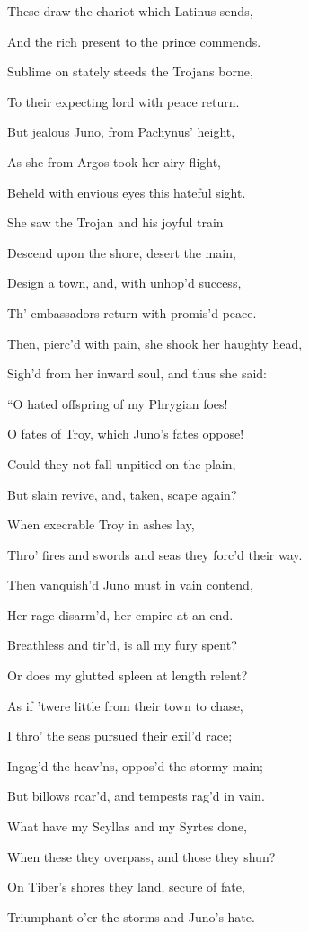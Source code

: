 These draw the chariot which Latinus sends,

And the rich present to the prince commends.

Sublime on stately steeds the Trojans borne,

To their expecting lord with peace return.

But jealous Juno, from Pachynus’ height,

As she from Argos took her airy flight,

Beheld with envious eyes this hateful sight.

She saw the Trojan and his joyful train

Descend upon the shore, desert the main,

Design a town, and, with unhop’d success,

Th’ embassadors return with promis’d peace.

Then, pierc’d with pain, she shook her haughty head,

Sigh’d from her inward soul, and thus she said:

“O hated offspring of my Phrygian foes!

O fates of Troy, which Juno’s fates oppose!

Could they not fall unpitied on the plain,

But slain revive, and, taken, scape again?

When execrable Troy in ashes lay,

Thro’ fires and swords and seas they forc’d their way.

Then vanquish’d Juno must in vain contend,

Her rage disarm’d, her empire at an end.

Breathless and tir’d, is all my fury spent?

Or does my glutted spleen at length relent?

As if ’twere little from their town to chase,

I thro’ the seas pursued their exil’d race;

Ingag’d the heav’ns, oppos’d the stormy main;

But billows roar’d, and tempests rag’d in vain.

What have my Scyllas and my Syrtes done,

When these they overpass, and those they shun?

On Tiber’s shores they land, secure of fate,

Triumphant o’er the storms and Juno’s hate.

